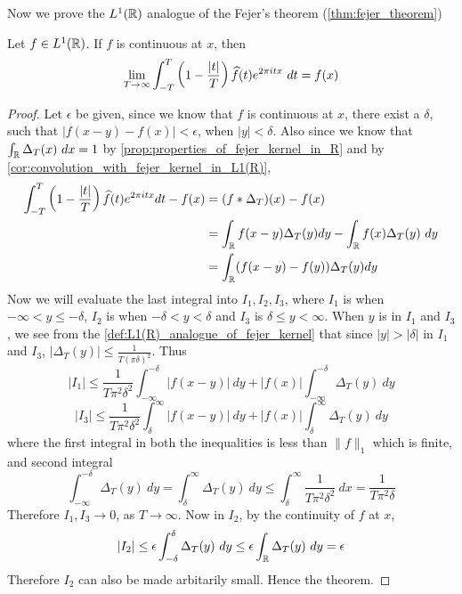 Now we prove the $L^1(\mathbb R)$ analogue of the Fejer's theorem (\autoref{thm:fejer_theorem})
\begin{theorem}
  \label{thm:L1(R)_analogue_of_fejer_theorem}
  Let $f \in L^1(\mathbb R)$. If $f$ is continuous at $x$, then $$\lim_{T \to \infty} \int_{-T}^{T}\left(1-\frac{|t|}{T}\right)\widehat{f}(t)e^{2\pi itx} \ dt = f(x)$$
\end{theorem}
\begin{proof}
  Let $\epsilon$ be given, since we know that $f$ is continuous at $x$, there exist a $\delta$, such that $|f(x-y) - f(x)| < \epsilon$, when $|y| < \delta$. Also since we know that $\int_\R \Delta_T(x) \ dx = 1$ by \autoref{prop:properties_of_fejer_kernel_in_R} and by \autoref{cor:convolution_with_fejer_kernel_in_L1(R)},
  \begin{align*}
    \int_{-T}^T\left(1-\frac{|t|}{T}\right)\widehat{f}(t)e^{2\pi itx} dt - f(x) &= (f*\Delta_T)(x) - f(x) \\
     &= \int_\mathbb R f(x-y) \Delta_T(y) dy - \int_\mathbb R f(x)\Delta_T(y) \ dy \\
     &= \int_\mathbb R (f(x-y) - f(y)) \Delta_T(y) dy \\ 
  \end{align*}
  Now we will evaluate the last integral into $I_1, I_2, I_3$, where $I_1$ is when $-\infty<y\le-\delta$, $I_2$ is when $-\delta < y < \delta$ and $I_3$ is $\delta \le y < \infty$. When $y$ is in $I_1$ and $I_3$, we see from the \autoref{def:L1(R)_analogue_of_fejer_kernel} that since $|y| > |\delta|$ in $I_1$ and $I_3$, $|\Delta_T(y)| \le \frac{1}{T(\pi\delta)^2}$. Thus $$|I_1| \le \frac{1}{T\pi^2\delta^2}\int_{-\infty}^{-\delta} |f(x-y)| \ dy + |f(x)|\int_{-\infty}^{-\delta}\Delta_T(y) \ dy $$ $$|I_3| \le \frac{1}{T\pi^2\delta^2}\int^{\infty}_{\delta} |f(x-y)| \ dy + |f(x)|\int^{\infty}_{\delta}\Delta_T(y) \ dy $$
  where the first integral in both the inequalities is less than $\|f\|_1$ which is finite, and second integral $$\int_{-\infty}^{-\delta} \Delta_T(y) \ dy = \int_\delta^\infty \Delta_T(y) \ dy \le \int_\delta^\infty \frac{1}{T\pi^2 \delta^2} \ dx = \frac{1}{T\pi^2 \delta}$$
  Therefore $I_1, I_3 \to 0$, as $T\to \infty$. Now in $I_2$, by the continuity of $f$ at $x$, $$|I_2| \le \epsilon\int_{-\delta}^\delta \Delta_T(y) \ dy \le \epsilon \int_\mathbb R \Delta_T(y) \ dy = \epsilon$$
  Therefore $I_2$ can also be made arbitarily small. Hence the theorem. 
\end{proof}

